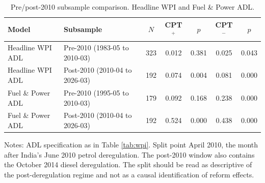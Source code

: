 \begin{table}[t]
\centering
\caption{Pre/post-2010 subsample comparison. Headline WPI and Fuel \& Power ADL.}
\label{tab:subsample}
\footnotesize
\setlength{\tabcolsep}{5pt}
\begin{threeparttable}
\begin{tabular}{l l c c c c c}
\toprule
Model & Subsample & $N$ & CPT$^+$ & $p$ & CPT$^-$ & $p$ \\
\midrule
Headline WPI ADL & Pre-2010 (1983-05 to 2010-03) & 323 & 0.012 & 0.381 & 0.025 & 0.043 \\
Headline WPI ADL & Post-2010 (2010-04 to 2026-03) & 192 & 0.074 & 0.004 & 0.081 & 0.000 \\
\midrule
Fuel \& Power ADL & Pre-2010 (1995-05 to 2010-03) & 179 & 0.092 & 0.168 & 0.238 & 0.000 \\
Fuel \& Power ADL & Post-2010 (2010-04 to 2026-03) & 192 & 0.524 & 0.000 & 0.438 & 0.000 \\
\bottomrule
\end{tabular}
\begin{tablenotes}\footnotesize
\item Notes: ADL specification as in Table \ref{tab:wpi}. Split point April 2010, the month after India's June 2010 petrol deregulation. The post-2010 window also contains the October 2014 diesel deregulation. The split should be read as descriptive of the post-deregulation regime and not as a causal identification of reform effects.
\end{tablenotes}
\end{threeparttable}
\end{table}
